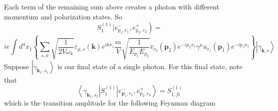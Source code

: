 Each term of the remaining sum above creates a photon with different momentum and polarization states. So
$$
\left.S_{1}^{(1)} | e_{\mathrm{p}_{1}, r_{1}}^{-}, e_{\mathrm{p}_{2}, r_{2}}^{+}\right)=
$$
$$
ie \int d^{4} x_{1}\left\{\sum_{s, k} \sqrt{\frac{1}{2 V\omega_k}} \varepsilon_{\mu, s}(\mathbf{k}) e^{i kx_1} \frac{m}{V} \sqrt{\frac{1}{E_{p_1} E_{p_{2}}}} \bar{v}_{r_{2}}\left(\mathbf{p}_{2}\right) e^{-i p_{2} x_{1}} \gamma^{\mu} u_{r_1}\left(\mathbf{p}_{1}\right) e^{-i p_{1} x_{1}}\right\}\left|\gamma_{\mathbf{k}, s}\right\rangle
$$
Suppose $\left|\gamma_{\mathbf{k}_1, s_1}\right\rangle$ is our final state of a single photon. For this final state, note that
$$
\left\langle\gamma_{\mathbf{k}_{1},s_{1}}\left|S_{1}^{(1)}\right| e_{\mathbf{p}_{1}, r_{1}}^{-}, e_{\mathrm{p}_{2}, r_{2}}^{+}\right\rangle=S_{1, f i}^{(1)}
$$
which is the transition amplitude for the following Feynman diagram
